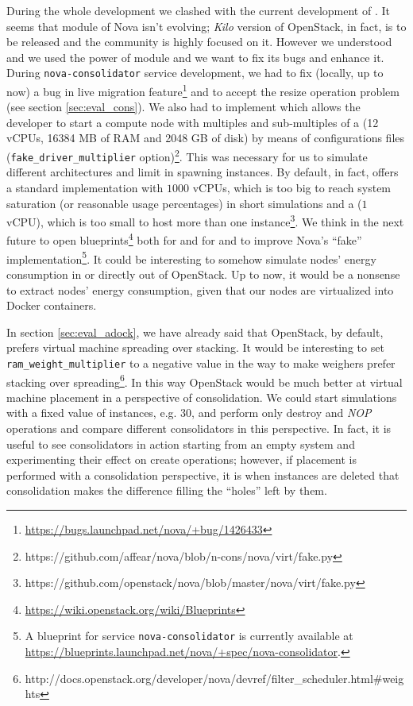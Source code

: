 During the whole development we clashed with the current development of . It seems that  module of Nova isn't evolving; \emph{Kilo} version of OpenStack, in fact, is to be released and the community is highly focused on it. However we understood and we used the power of  module and we want to fix its bugs and enhance it. During \texttt{nova-consolidator} service development, we had to fix (locally, up to now) a bug in live migration feature\footnote{\url{https://bugs.launchpad.net/nova/+bug/1426433}} and to accept the resize operation problem (see section \ref{sec:eval_cons}). We also had to implement  which allows the developer to start a compute node with multiples and sub-multiples of a  (12 vCPUs, 16384 MB of RAM and 2048 GB of disk) by means of configurations files (\texttt{fake\_driver\_multiplier} option)\footnote{https://github.com/affear/nova/blob/n-cons/nova/virt/fake.py}. This was necessary for us to simulate different architectures and limit in spawning instances. By default, in fact,  offers a standard implementation with $1000$ vCPUs, which is too big to reach system saturation (or reasonable usage percentages) in short simulations and a  ($1$ vCPU), which is too small to host more than one instance\footnote{https://github.com/openstack/nova/blob/master/nova/virt/fake.py}. We think in the next future to open blueprints\footnote{\url{https://wiki.openstack.org/wiki/Blueprints}} both for  and for  and to improve Nova's ``fake'' implementation\footnote{A blueprint for service \texttt{nova-consolidator} is currently available at \url{https://blueprints.launchpad.net/nova/+spec/nova-consolidator}.}. It could be interesting to somehow simulate nodes' energy consumption in  or directly out of OpenStack. Up to now, it would be a nonsense to extract nodes' energy consumption, given that our nodes are virtualized into Docker containers.

In section \ref{sec:eval_adock}, we have already said that OpenStack, by default, prefers virtual machine spreading over stacking. It would be interesting to set \texttt{ram\_weight\_multiplier} to a negative value in the way to make weighers prefer stacking over spreading\footnote{http://docs.openstack.org/developer/nova/devref/filter\_scheduler.html\#weights}. In this way OpenStack would be much better at virtual machine placement in a perspective of consolidation. We could start simulations with a fixed value of instances, e.g. $30$, and perform only destroy and \textit{NOP} operations and compare different consolidators in this perspective. In fact, it is useful to see consolidators in action starting from an empty system and experimenting their effect on create operations; however, if placement is performed with a consolidation perspective, it is when instances are deleted that consolidation makes the difference filling the ``holes'' left by them.